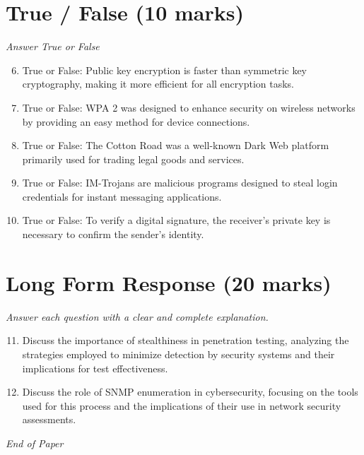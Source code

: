\documentclass[12pt]{article}
\begin{document}
\section*{True / False (10 marks)}
\textit{Answer True or False}
\begin{enumerate}[label=\arabic*.]
\setcounter{enumi}{5}
\item True or False: Public key encryption is faster than symmetric key cryptography, making it more efficient for all encryption tasks.
\item True or False: WPA 2 was designed to enhance security on wireless networks by providing an easy method for device connections.
\item True or False: The Cotton Road was a well-known Dark Web platform primarily used for trading legal goods and services.
\item True or False: IM-Trojans are malicious programs designed to steal login credentials for instant messaging applications.
\item True or False: To verify a digital signature, the receiver's private key is necessary to confirm the sender's identity.
\end{enumerate}

\section*{Long Form Response (20 marks)}
\textit{Answer each question with a clear and complete explanation.}
\begin{enumerate}[label=\arabic*.]
\setcounter{enumi}{10}
\item Discuss the importance of stealthiness in penetration testing, analyzing the strategies employed to minimize detection by security systems and their implications for test effectiveness.
\item Discuss the role of SNMP enumeration in cybersecurity, focusing on the tools used for this process and the implications of their use in network security assessments.
\end{enumerate}

\vfill
\noindent\textit{End of Paper}
\end{document}
